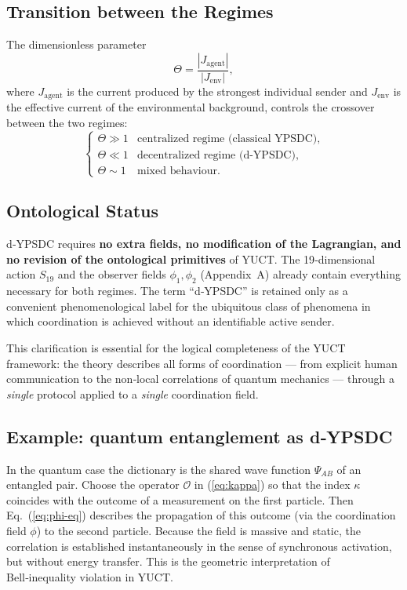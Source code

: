 \documentclass[12pt,a4paper]{article}
\begin{document}
	\subsection{Transition between the Regimes}
	The dimensionless parameter
	\[
	\Theta = \frac{|J_{\mathrm{agent}}|}{|J_{\mathrm{env}}|},
	\]
	where $J_{\mathrm{agent}}$ is the current produced by the strongest individual sender and
	$J_{\mathrm{env}}$ is the effective current of the environmental background, controls the
	crossover between the two regimes:
	\[
	\begin{cases}
		\Theta \gg 1 & \text{centralized regime (classical YPSDC)}, \\
		\Theta \ll 1 & \text{decentralized regime (d‑YPSDC)}, \\
		\Theta \sim 1 & \text{mixed behaviour}.
	\end{cases}
	\]
	
	\subsection{Ontological Status}
	d‑YPSDC requires \textbf{no extra fields, no modification of the Lagrangian, and no
		revision of the ontological primitives} of YUCT. The 19‑dimensional action
	$S_{19}$ and the observer fields $\phi_1,\phi_2$ (Appendix~A) already contain
	everything necessary for both regimes. The term ``d‑YPSDC'' is retained only
	as a convenient phenomenological label for the ubiquitous class of phenomena in
	which coordination is achieved without an identifiable active sender.
	
	This clarification is essential for the logical completeness of the YUCT framework:
	the theory describes all forms of coordination --- from explicit human communication to
	the non‑local correlations of quantum mechanics --- through a \emph{single} protocol
	applied to a \emph{single} coordination field.
	
	\subsection{Example: quantum entanglement as d‑YPSDC}
	
	In the quantum case the dictionary is the shared wave function \(\Psi_{AB}\) of an entangled pair. Choose the operator \(\mathcal{O}\) in (\ref{eq:kappa}) so that the index \(\kappa\) coincides with the outcome of a measurement on the first particle. Then Eq.~(\ref{eq:phi-eq}) describes the propagation of this outcome (via the coordination field \(\phi\)) to the second particle. Because the field is massive and static, the correlation is established instantaneously in the sense of synchronous activation, but without energy transfer. This is the geometric interpretation of Bell‑inequality violation in YUCT.
	
\end{document}
